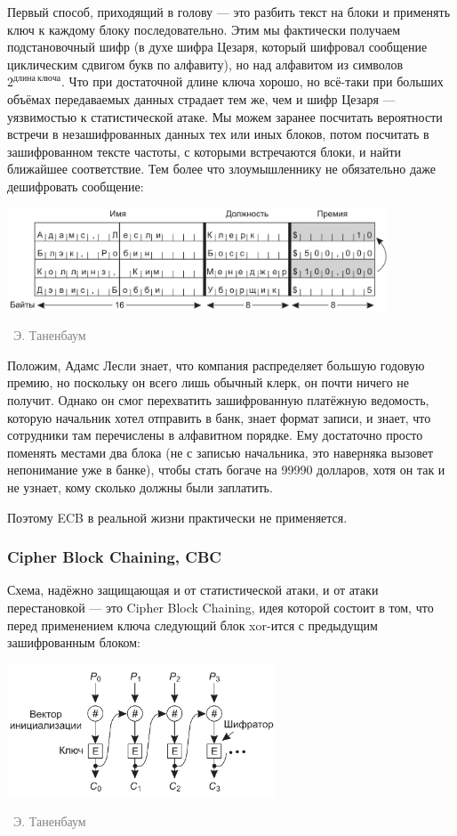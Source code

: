 \documentclass[a5paper]{article}
\newcommand{\attribution}[1] {
\vspace{-5mm}\begin{flushright}\begin{scriptsize}\textcolor{gray}{\textcopyright\, #1}\end{scriptsize}\end{flushright}
}
\begin{document}
Первый способ, приходящий в голову --- это разбить текст на блоки и применять ключ к каждому блоку последовательно. Этим мы фактически получаем подстановочный шифр (в духе шифра Цезаря, который шифровал сообщение циклическим сдвигом букв по алфавиту), но над алфавитом из символов $2^{длина\ ключа}$. Что при достаточной длине ключа хорошо, но всё-таки при больших объёмах передаваемых данных страдает тем же, чем и шифр Цезаря --- уязвимостью к статистической атаке. Мы можем заранее посчитать вероятности встречи в незашифрованных данных тех или иных блоков, потом посчитать в зашифрованном тексте частоты, с которыми встречаются блоки, и найти ближайшее соответствие. Тем более что злоумышленнику не обязательно даже дешифровать сообщение: 

\begin{center}
    \includegraphics[width=0.85\textwidth]{ecbAttack.png}
    \attribution{Э. Таненбаум}
\end{center}

Положим, Адамс Лесли знает, что компания распределяет большую годовую премию, но поскольку он всего лишь обычный клерк, он почти ничего не получит. Однако он смог перехватить зашифрованную платёжную ведомость, которую начальник хотел отправить в банк, знает формат записи, и знает, что сотрудники там перечислены в алфавитном порядке. Ему достаточно просто поменять местами два блока (не с записью начальника, это наверняка вызовет непонимание уже в банке), чтобы стать богаче на 99990 долларов, хотя он так и не узнает, кому сколько должны были заплатить.

Поэтому ECB в реальной жизни практически не применяется.

\subsubsection{Cipher Block Chaining, CBC}

Схема, надёжно защищающая и от статистической атаки, и от атаки перестановкой --- это Cipher Block Chaining, идея которой состоит в том, что перед применением ключа следующий блок xor-ится с предыдущим зашифрованным блоком:

\begin{center}
    \includegraphics[width=0.6\textwidth]{cbc.png}
    \attribution{Э. Таненбаум}
\end{center}
\end{document}
